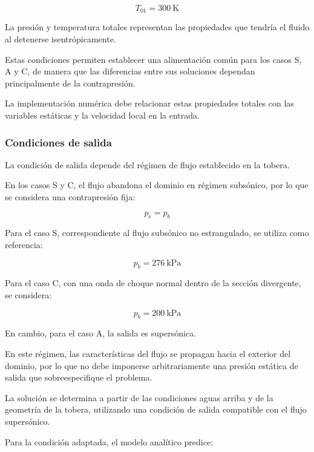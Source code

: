\documentclass[12pt,letterpaper]{article}
\numberwithin{equation}{section}
\begin{document}
\begin{equation}
    T_{01}=300\ \mathrm{K}
\end{equation}

La presión y temperatura totales
representan las propiedades que tendría
el fluido al detenerse isentrópicamente.

Estas condiciones permiten establecer
una alimentación común para los casos
S, A y C, de manera que las diferencias
entre sus soluciones dependan
principalmente de la contrapresión.

La implementación numérica debe
relacionar estas propiedades totales
con las variables estáticas y la
velocidad local en la entrada.


\subsubsection{Condiciones de salida}

La condición de salida depende del
régimen de flujo establecido en
la tobera.

En los casos S y C, el flujo
abandona el dominio en régimen
subsónico, por lo que se considera
una contrapresión fija:

\begin{equation}
    p_e=p_b
\end{equation}

Para el caso S, correspondiente
al flujo subsónico no estrangulado,
se utiliza como referencia:

\begin{equation}
    p_b=276\ \mathrm{kPa}
\end{equation}

Para el caso C, con una onda
de choque normal dentro de la
sección divergente, se considera:

\begin{equation}
    p_b=200\ \mathrm{kPa}
\end{equation}

En cambio, para el caso A,
la salida es supersónica.

En este régimen, las características
del flujo se propagan hacia el
exterior del dominio, por lo que
no debe imponerse arbitrariamente
una presión estática de salida
que sobreespecifique el problema.

La solución se determina a partir
de las condiciones aguas arriba
y de la geometría de la tobera,
utilizando una condición de salida
compatible con el flujo supersónico.

Para la condición adaptada,
el modelo analítico predice:
\end{document}

